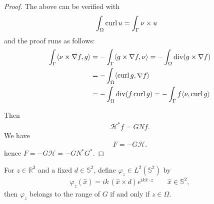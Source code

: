 \begin{proof}
The above can be verified with
\begin{align*}
  \int_{\Omega}\operatorname{curl} u &= \int_{\Gamma}\nu\times u
\end{align*}
and the proof runs as follows:
\begin{align*}
  \int_{\Gamma}\langle\nu\times\nabla f, g\rangle 
  &= -\int_{\Gamma}\langle g\times\nabla f, \nu\rangle =-\int_{\Omega}\operatorname{div}(g\times\nabla f) \\
  &=-\int_{\Omega}\langle\operatorname{curl} g, \nabla f\rangle \\
  &=-\int_{\Omega}\operatorname{div}(f\operatorname{curl} g) =-\int_{\Gamma}f\langle\nu,\operatorname{curl} g\rangle \\
\end{align*}

  Then
  \begin{align}
    \mathcal{H}^*f = GNf.
  \end{align}
  We have
  \begin{align}
    F=-G\mathcal{H}.
  \end{align}
  hence $F=-G\mathcal{H}=-GN^*G^*$.
\end{proof}

\begin{prp}
  For $z\in\mathbb{R}^3$ and a fixed $d\in\mathbb{S}^2$, define $\varphi_z\in L^2(\mathbb{S}^2)$ by
  \begin{align*}
    \varphi_z(\hat{x}) = ik\,(\hat{x}\times d) e^{ik\hat{x}\cdot z}\qquad\hat{x}\in\mathbb{S}^2,
  \end{align*}
  then $\varphi_z$ belongs to the range of $G$ if and only if $z\in\Omega$.
\end{prp}

